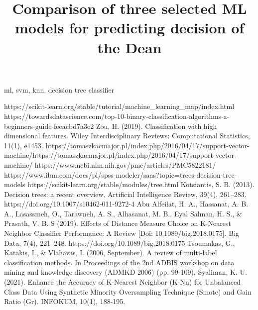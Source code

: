 \documentclass[conference]{IEEEtran}
\begin{document}
\title{Comparison of three selected ML models for predicting decision of the Dean}

\author{
\and
{}
}

\maketitle



\begin{IEEEkeywords}
ml, svm, knn, decision tree classifier
\end{IEEEkeywords}




\begin{thebibliography}{00}
 https://scikit-learn.org/stable/tutorial/machine\_learning\_map/index.html
 https://towardsdatascience.com/top-10-binary-classification-algorithms-a-beginners-guide-feeacbd7a3e2
 Zou, H. (2019). Classification with high dimensional features. Wiley Interdisciplinary Reviews: Computational Statistics, 11(1), e1453.
 https://tomaszkacmajor.pl/index.php/2016/04/17/support-vector-machine/https://tomaszkacmajor.pl/index.php/2016/04/17/support-vector-machine/
 https://www.ncbi.nlm.nih.gov/pmc/articles/PMC5822181/
 https://www.ibm.com/docs/pl/spss-modeler/saas?topic=trees-decision-tree-models
 https://scikit-learn.org/stable/modules/tree.html
 Kotsiantis, S. B. (2013). Decision trees: a recent overview. Artificial Intelligence Review, 39(4), 261–283. https://doi.org/10.1007/s10462-011-9272-4
 Abu Alfeilat, H. A., Hassanat, A. B. A., Lasassmeh, O., Tarawneh, A. S., Alhasanat, M. B., Eyal Salman, H. S., \& Prasath, V. B. S (2019). Effects of Distance Measure Choice on K-Nearest Neighbor Classifier Performance: A Review [Doi: 10.1089/big.2018.0175]. Big Data, 7(4), 221–248. https://doi.org/10.1089/big.2018.0175
 Tsoumakas, G., Katakis, I., \& Vlahavas, I. (2006, September). A review of multi-label classification methods. In Proceedings of the 2nd ADBIS workshop on data mining and knowledge discovery (ADMKD 2006) (pp. 99-109).
 Syaliman, K. U. (2021). Enhance the Accuracy of K-Nearest Neighbor (K-Nn) for Unbalanced Class Data Using Synthetic Minority Oversampling Technique (Smote) and Gain Ratio (Gr). INFOKUM, 10(1), 188-195.

\end{thebibliography}
\end{document}
